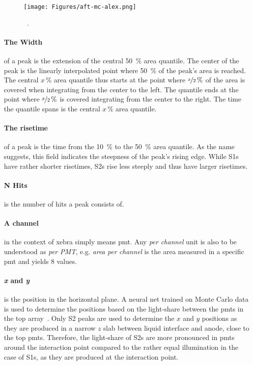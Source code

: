 \begin{figure}
\centering
\texttt{[image: Figures/aft-mc-alex.png]}  %
    \caption[AFT in XeBRA Simulated]{
        ~\cite{ABism}.
    }
\label{fig:aft-mc}
\end{figure}

\paragraph{The Width} of a peak is the extension of the central \SI{50}{\%} area quantile.
The center of the peak is the linearly interpolated point where \SI{50}{\%} of the peak's area is reached.
The central $ x\,\% $ area quantile thus starts at the point where $ \nicefrac{x}{2}\,\% $ of the area is covered when integrating from the center to the left.
The quantile ends at the point where $ \nicefrac{x}{2}\,\% $ is covered integrating from the center to the right.
The time the quantile spans is the central $ x\,\% $ area quantile.

\paragraph{The risetime} of a peak is the time from the \SI{10}{\%} to the \SI{50}{\%} area quantile.
As the name suggests, this field indicates the steepness of the peak's rising edge.
While S1s have rather shorter risetimes, S2s rise less steeply and thus have larger risetimes.

\paragraph{N Hits} is the number of hits a peak consists of.

\paragraph{A channel} in the context of \gls{xebra} simply means \gls{pmt}.
Any \emph{per channel} unit is also to be understood as \emph{per PMT}, e.g. \emph{area per channel} is the area measured in a specific \gls{pmt} and yields 8 values.

\paragraph{\emph{x} and \emph{y}} is the position in the horizontal plane.
A neural net trained on Monte Carlo data is used to determine the positions based on the light-share between the \glspl{pmt} in the top array~\cite{ABism}.
Only S2 peaks are used to determine the $ x $ and $ y $ positions as they are produced in a narrow $ z $ slab between liquid interface and anode, close to the top \glspl{pmt}.
Therefore, the light-share of S2s are more pronounced in \glspl{pmt} around the interaction point compared to the rather equal illumination in the case of S1s, as they are produced at the interaction point.



